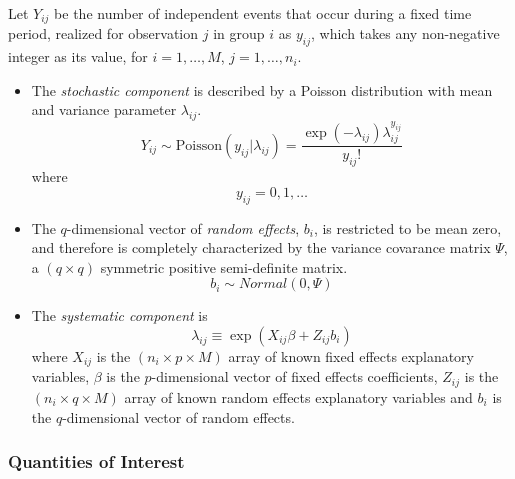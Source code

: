 Let $Y_{ij}$ be the number of independent events that occur during a fixed time period, realized for observation $j$ in group $i$ as $y_{ij}$, which takes any non-negative integer as its value, for $i = 1, \ldots, M$, $j = 1, \ldots, n_i$.

\begin{itemize}
\item The \emph{stochastic component} is described by a Poisson distribution with mean and variance parameter $\lambda_{ij}$.
\begin{equation*}
Y_{ij} \sim \mathrm{Poisson}(y_{ij} | \lambda_{ij}) = \frac{\exp(-\lambda_{ij}) \lambda_{ij}^{y_{ij}}}{y_{ij}!}
\end{equation*}
where
\begin{equation*}
y_{ij} = 0, 1, \ldots
\end{equation*}
\item The $q$-dimensional vector of \emph{random effects}, $b_i$, is restricted to be mean zero, and therefore is completely characterized by the variance covarance matrix $\Psi$, a $(q \times q)$ symmetric positive semi-definite matrix.
\begin{equation*}
b_i \sim Normal(0, \Psi)
\end{equation*}
\item The \emph{systematic component} is
\begin{equation*}
\lambda_{ij} \equiv \exp(X_{ij} \beta + Z_{ij} b_i)
\end{equation*}
where $X_{ij}$ is the $(n_i \times p \times M)$ array of known fixed effects explanatory variables, $\beta$ is the $p$-dimensional vector of fixed effects coefficients, $Z_{ij}$ is the $(n_i \times q \times M)$ array of known random effects explanatory variables and $b_i$ is the $q$-dimensional vector of random effects.
\end{itemize}

\subsubsection{Quantities of Interest}


